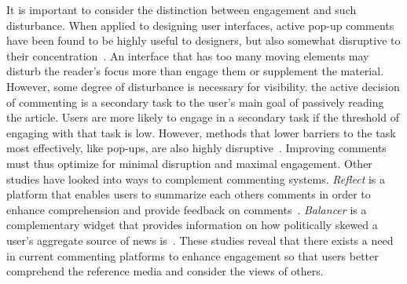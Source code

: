 It is important to consider the distinction between engagement and such disturbance. When applied to designing user interfaces, active pop-up comments have been found to be highly useful to designers, but also somewhat disruptive to their concentration~\cite{CommentingSystems}. An interface that has too many moving elements may disturb the reader's focus more than engage them or supplement the material. However, some degree of disturbance is necessary for visibility. the active decision of commenting is a secondary task to the user's main goal of passively reading the article. Users are more likely to engage in a secondary task if the threshold of engaging with that task is low. However, methods that lower barriers to the task most effectively, like pop-ups, are also highly disruptive~\cite{Wikipedia}. Improving comments must thus optimize for minimal disruption and maximal engagement.
Other studies have looked into ways to complement commenting systems. \textit{Reflect} is a platform that enables users to summarize each others comments in order to enhance comprehension and provide feedback on comments~\cite{Reflect}. \textit{Balancer} is a complementary widget that provides information on how politically skewed a user's aggregate source of news is~\cite{Politics}. These studies reveal that there exists a need in current commenting platforms to enhance engagement so that users better comprehend the reference media and consider the views of others.
